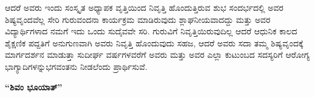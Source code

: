 {ಆದರೆ ಅವರು ಇಂದು ಸಂಸ್ಕೃತ ಅಧ್ಯಾಪಕ ವೃತ್ತಿಯಿಂದ ನಿವೃತ್ತಿ ಹೊಂದುತ್ತಿರುವ ಶುಭ ಸಂದರ್ಭದಲ್ಲಿ ಅವರ ಶಿಷ್ಯವೃಂದವೆಲ್ಲ ಸೇರಿ ಗುರುವಂದನಾ ಕಾರ್ಯಕ್ರಮ ಮಾಡಿರುವುದು ಶ್ಲಾಘನೀಯವಾದದ್ದು ಮತ್ತು ಅವರ ವಿದ್ಯಾರ್ಥಿಗಳಾದ ನಮಗೆ ಇದು ಒಂದು ಸುದೈವವೇ ಸರಿ. ಗುರುವಿಗೆ ನಿವೃತ್ತಿಯಿರುವುದಿಲ್ಲ ಆದರೆ ಆಧುನಿಕ ಕಾಲದ ಶೈಕ್ಷಣಿಕ ಪದ್ದತಿಗೆ ಅನುಗುಣವಾಗಿ ಅವರು ನಿವೃತ್ತಿ ಹೊಂದುವುದು ಸಹಜ, ಆದರೆ ಅವರು ಸದಾ ತಮ್ಮ ಶಿಷ್ಯವೃಂದಕ್ಕೆ ಮಾರ್ಗದರ್ಶನ ಮಾಡುತ್ತಾ ಸುದೀರ್ಘ ವರ್ಷಗಳ\-ವರೆಗೆ ಅವರು ಮತ್ತು ಅವರ ಎಲ್ಲಾ ಕುಟುಂಬದ ಸದಸ್ಯರಿಗೆ ಆರೋಗ್ಯ ಭಾಗ್ಯಾದಿಗಳನ್ನು\break ಭಗವಂತನು ನೀಡಲೆಂದು ಪ್ರಾರ್ಥಿಸುವೆ.

\centerline{\textbf{“ಶಿವಂ ಭೂಯಾತ್”}}

\articleend
}
